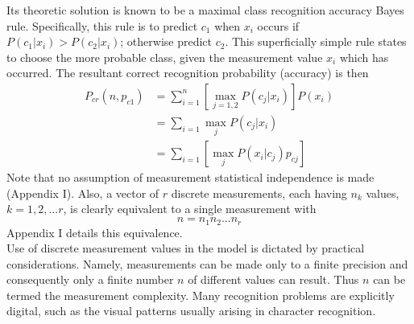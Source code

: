 \documentclass[10pt, a4paper]{article}
\begin{document}
\begin{CJK*}{UTF8}{bsmi}
\begin{multicols}{2}
Its theoretic solution is known to be a maximal class recognition accuracy Bayes rule.
Specifically, this rule is to predict $c_1$ when $x_i$ occurs if $P(c_1 | x_i) > P(c_2 | x_i)$; otherwise predict $c_2$.
This superficially simple rule states to choose the more probable class, given the measurement value $x_i$ which has occurred. The resultant correct recognition probability (accuracy) is then
\begin{align}
    P_{cr}(n, p_{c1}) &= \sum_{i=1}^{n}\left[ \underset{j=1,2}{\max} P(c_j | x_i)\right]P(x_i)\\
    &=\sum_{i=1}^{}\underset{j}{\max} P(c_j | x_i)\\
    &=\sum_{i=1}^{}\left[\underset{j}{\max} P(x_i | c_j)p_{cj}\right]
\end{align}
\hspace{1em} Note that no assumption of measurement statistical independence is made (Appendix I). 
Also, a vector of $r$ discrete measurements, each having $n_k$ values, $k = 1, 2, ... r$, is clearly equivalent to a single measurement with 
\begin{equation}
    n=n_1 n_2 ... n_r
\end{equation}
Appendix I details this equivalence.\\
\hspace{1em} Use of discrete measurement values in the model is dictated by practical considerations. 
Namely, measurements can be made only to a finite precision and consequently only a finite number $n$ of different values can result. 
Thus $n$ can be termed the measurement complexity. 
Many recognition problems are explicitly digital, such as the visual patterns usually arising in character recognition.\\


\end{multicols}
\end{CJK*}
\end{document}
